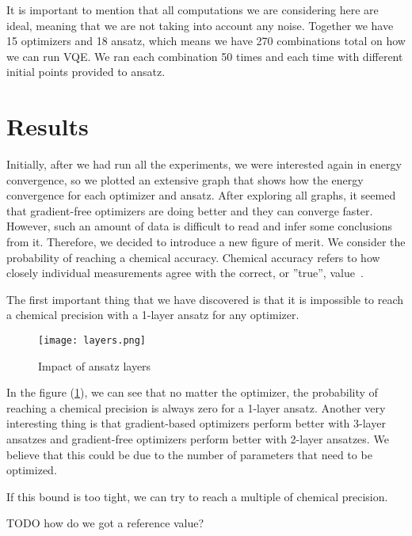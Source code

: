 It is important to mention that all computations we are considering here are ideal, meaning that we are not taking into account any noise. Together we have 15 optimizers and 18 ansatz, which means we have 270 combinations total on how we can run VQE. We ran each combination 50 times and each time with different initial points provided to ansatz. 

\section{Results} 
Initially, after we had run all the experiments, we were interested again in energy convergence, so we plotted an extensive graph that shows how the energy convergence for each optimizer and ansatz. After exploring all graphs, it seemed that gradient-free optimizers are doing better and they can converge faster. However, such an amount of data is difficult to read and infer some conclusions from it. Therefore, we decided to introduce a new figure of merit. We consider the probability of reaching a chemical accuracy. Chemical accuracy refers to how closely individual measurements agree with the correct, or ''true'', value~\cite{chemistry}. 


The first important thing that we have discovered is that it is impossible to reach a chemical precision with a 1-layer ansatz for any optimizer.
\begin{figure}[H]
    \centering
    \texttt{[image: layers.png]}
    \caption{Impact of ansatz layers}
    \label{fig:ansatz-layers}
\end{figure}

In the figure (\ref{fig:ansatz-layers}), we can see that no matter the optimizer, the probability of reaching a chemical precision is always zero for a 1-layer ansatz. Another very interesting thing is that gradient-based optimizers perform better with 3-layer ansatzes and gradient-free optimizers perform better with 2-layer ansatzes. We believe that this could be due to the number of parameters that need to be optimized.  



If this bound is too tight, we can try to reach a multiple of chemical precision. 



TODO how do we got a reference value?